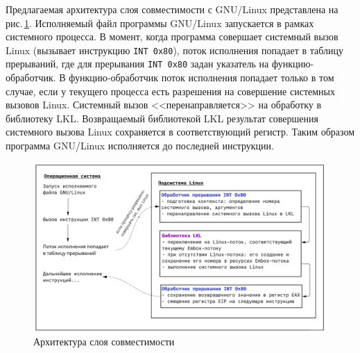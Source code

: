 Предлагаемая архитектура слоя совместимости с GNU/Linux представлена на рис.\,\ref{fig:arch}. Исполняемый файл программы GNU/Linux запускается в рамках системного процесса. В момент, когда программа совершает системный вызов Linux (вызывает инструкцию \texttt{INT 0x80}), поток исполнения попадает в таблицу прерываний, где для прерывания \texttt{INT 0x80} задан указатель на функцию-обработчик. В функцию-обработчик поток исполнения попадает только в том случае, если у текущего процесса есть разрешения на совершение системных вызовов Linux. Системный вызов <<перенаправляется>> на обработку в библиотеку LKL. Возвращаемый библиотекой LKL результат совершения системного вызова Linux сохраняется в соответствующий регистр. Таким образом программа GNU/Linux исполняется до последней инструкции.

\begin{figure}[H]
\includegraphics[width=\textwidth]{pictures/Arch.jpg}
\caption{Архитектура слоя совместимости}
\label{fig:arch}
\end{figure}
